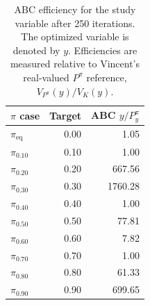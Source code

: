 \begin{table}[!htbp]
\centering
\small
\caption{ABC efficiency for the study variable after 250 iterations. The optimized variable is denoted by \(y\). Efficiencies are measured relative to Vincent's real-valued \(P^\pi\) reference, \(V_{P^\pi}(y)/V_K(y)\).}
\label{tab:abc-y-positive-pi-250}
\begin{tabular}{lrr}
\toprule
\(\pi\) case & Target & ABC \(y/P^\pi_y\) \\
\midrule
\(\pi_{\mathrm{eq}}\) & 0.00 & 1.05 \\ 
\(\pi_{0.10}\) & 0.10 & 1.00 \\ 
\(\pi_{0.20}\) & 0.20 & 667.56 \\ 
\(\pi_{0.30}\) & 0.30 & 1760.28 \\ 
\(\pi_{0.40}\) & 0.40 & 1.00 \\ 
\(\pi_{0.50}\) & 0.50 & 77.81 \\ 
\(\pi_{0.60}\) & 0.60 & 7.82 \\ 
\(\pi_{0.70}\) & 0.70 & 1.00 \\ 
\(\pi_{0.80}\) & 0.80 & 61.33 \\ 
\(\pi_{0.90}\) & 0.90 & 699.65 \\ 
\bottomrule
\end{tabular}
\end{table}
